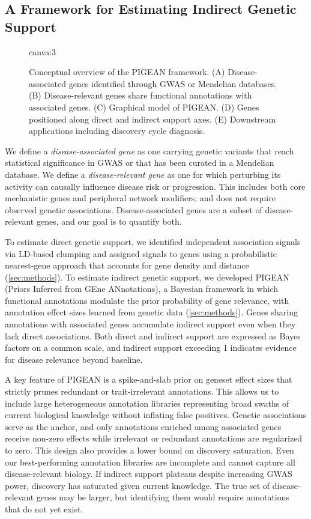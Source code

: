 \subsection{A Framework for Estimating Indirect Genetic Support}

\begin{figure}[h!]
    \centering
    {{canva:3}}
    \caption{Conceptual overview of the PIGEAN framework. (A) Disease-associated genes identified through GWAS or Mendelian databases. (B) Disease-relevant genes share functional annotations with associated genes. (C) Graphical model of PIGEAN. (D) Genes positioned along direct and indirect support axes. (E) Downstream applications including discovery cycle diagnosis.}
    \label{fig:pigean-method}
\end{figure}

We define a \textit{disease-associated gene} as one carrying genetic variants that reach statistical significance in GWAS or that has been curated in a Mendelian database. We define a \textit{disease-relevant gene} as one for which perturbing its activity can causally influence disease risk or progression. This includes both core mechanistic genes and peripheral network modifiers, and does not require observed genetic associations. Disease-associated genes are a subset of disease-relevant genes, and our goal is to quantify both.

To estimate direct genetic support, we identified independent association signals via LD-based clumping \cite{purcell_plink_2007} and assigned signals to genes using a probabilistic nearest-gene approach that accounts for gene density and distance \cite{dornbos_evaluating_2022} (\ref{sec:methods}). To estimate indirect genetic support, we developed PIGEAN (Priors Inferred from GEne ANnotations), a Bayesian framework in which functional annotations modulate the prior probability of gene relevance, with annotation effect sizes learned from genetic data (\ref{sec:methods}). Genes sharing annotations with associated genes accumulate indirect support even when they lack direct associations. Both direct and indirect support are expressed as Bayes factors on a common scale, and indirect support exceeding 1 indicates evidence for disease relevance beyond baseline.

A key feature of PIGEAN is a spike-and-slab prior on geneset effect sizes that strictly prunes redundant or trait-irrelevant annotations. This allows us to include large heterogeneous annotation libraries representing broad swaths of current biological knowledge without inflating false positives. Genetic associations serve as the anchor, and only annotations enriched among associated genes receive non-zero effects while irrelevant or redundant annotations are regularized to zero. This design also provides a lower bound on discovery saturation. Even our best-performing annotation libraries are incomplete and cannot capture all disease-relevant biology. If indirect support plateaus despite increasing GWAS power, discovery has saturated given current knowledge. The true set of disease-relevant genes may be larger, but identifying them would require annotations that do not yet exist.

